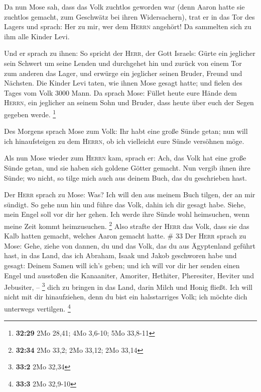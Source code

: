  Da nun Mose sah, dass das Volk zuchtlos geworden war
(denn Aaron hatte sie zuchtlos gemacht, zum Geschwätz bei ihren
Widersachern),  trat er in das Tor des Lagers und sprach:
Her zu mir, wer dem \textsc{Herrn} angehört! Da sammelten sich zu ihm
alle Kinder Levi.

 Und er sprach zu ihnen: So spricht der \textsc{Herr},
der Gott Israels: Gürte ein jeglicher sein Schwert um seine Lenden und
durchgehet hin und zurück von einem Tor zum anderen das Lager, und
erwürge ein jeglicher seinen Bruder, Freund und Nächsten.
 Die Kinder Levi taten, wie ihnen Mose gesagt hatte; und
fielen des Tages vom Volk 3000 Mann.  Da sprach Mose:
Füllet heute eure Hände dem \textsc{Herrn}, ein jeglicher an seinem Sohn
und Bruder, dass heute über euch der Segen gegeben werde. \footnote{\textbf{32:29}
  2Mo 28,41; 4Mo 3,6-10; 5Mo 33,8-11}

 Des Morgens sprach Mose zum Volk: Ihr habt eine große
Sünde getan; nun will ich hinaufsteigen zu dem \textsc{Herrn}, ob ich
vielleicht eure Sünde versöhnen möge.

 Als nun Mose wieder zum \textsc{Herrn} kam, sprach er:
Ach, das Volk hat eine große Sünde getan, und sie haben sich goldene
Götter gemacht.  Nun vergib ihnen ihre Sünde; wo nicht,
so tilge mich auch aus deinem Buch, das du geschrieben hast.

 Der \textsc{Herr} sprach zu Mose: Was? Ich will den aus
meinem Buch tilgen, der an mir sündigt.  So gehe nun hin
und führe das Volk, dahin ich dir gesagt habe. Siehe, mein Engel soll
vor dir her gehen. Ich werde ihre Sünde wohl heimsuchen, wenn meine Zeit
kommt heimzusuchen. \footnote{\textbf{32:34} 2Mo 33,2; 2Mo 33,12; 2Mo
  33,14}  Also strafte der \textsc{Herr} das Volk, dass
sie das Kalb hatten gemacht, welches Aaron gemacht hatte. \# 33
 Der \textsc{Herr} sprach zu Mose: Gehe, ziehe von dannen,
du und das Volk, das du aus Ägyptenland geführt hast, in das Land, das
ich Abraham, Isaak und Jakob geschworen habe und gesagt: Deinem Samen
will ich's geben;  und ich will vor dir her senden einen
Engel und ausstoßen die Kanaaniter, Amoriter, Hethiter, Pheresiter,
Heviter und Jebusiter, -- \footnote{\textbf{33:2} 2Mo 32,34}
 dich zu bringen in das Land, darin Milch und Honig
fließt. Ich will nicht mit dir hinaufziehen, denn du bist ein
halsstarriges Volk; ich möchte dich unterwegs vertilgen. \footnote{\textbf{33:3}
  2Mo 32,9-10}

